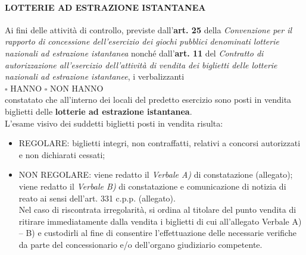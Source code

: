 \documentclass[12pt]{article}
\begin{document}
\paragraph{LOTTERIE AD ESTRAZIONE ISTANTANEA}
Ai fini delle attività di controllo, previste dall’\textbf{art. 25} della \textit{Convenzione per il rapporto di concessione dell’esercizio dei giochi pubblici denominati lotterie nazionali ad estrazione istantanea} nonché dall’\textbf{art. 11} del \textit{Contratto di autorizzazione all’esercizio dell’attività di vendita dei biglietti delle lotterie nazionali ad estrazione istantanee}, i verbalizzanti\\
\begin{math}\square\end{math} HANNO \begin{math}\square\end{math} NON HANNO\\
constatato che all’interno dei locali del predetto esercizio sono posti in vendita biglietti delle \textbf{lotterie ad estrazione istantanea}.\\
L'esame visivo dei suddetti biglietti posti in vendita risulta:
\begin{itemize}[label={\begin{math}\square\end{math}}]
    \item REGOLARE: biglietti integri, non contraffatti, relativi a concorsi autorizzati e non dichiarati cessati;
    \item NON REGOLARE: viene redatto il \textit{Verbale A)} di constatazione (allegato);\\ viene redatto il \textit{Verbale B)} di constatazione e comunicazione di notizia di reato ai sensi dell'art. 331 c.p.p. (allegato).\\
    Nel caso di riscontrata irregolarità, si ordina al titolare del punto vendita di ritirare immediatamente dalla vendita i biglietti di cui all’allegato Verbale A) – B) e custodirli al fine di consentire l’effettuazione delle necessarie verifiche da parte del concessionario e/o dell’organo giudiziario competente.
\end{itemize}
\end{document}
